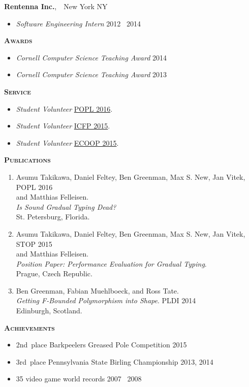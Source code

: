 \documentclass{article}
\newcommand{\mysection}[1]{\vspace{0.5cm}
\hspace{-1.3cm}\textsc{\textbf{#1}}~\hrulefill}
\newcommand{\mysubsection}[1]{\hspace{-0.7cm}\textbf{#1}}
\begin{document}
\mysubsection{Rentenna Inc.},~~New York NY
\begin{itemize}
\item \emph{Software Engineering Intern} \hfill 2012 \textendash\ 2014
\end{itemize}

\newpage
\mysection{Awards} %
\begin{itemize}
\item \emph{Cornell Computer Science Teaching Award} \hfill 2014
\item \emph{Cornell Computer Science Teaching Award} \hfill 2013
\end{itemize}



\mysection{Service}
\begin{itemize}
\item \emph{Student Volunteer} \hfill \href{http://conf.researchr.org/home/POPL-2016}{POPL 2016}.
\item \emph{Student Volunteer} \hfill \href{http://icfpconference.org/icfp2015/}{ICFP 2015}.
\item \emph{Student Volunteer} \hfill \href{http://2015.ecoop.org/}{ECOOP 2015}.
\end{itemize}


\mysection{Publications}

\begin{enumerate}
\item
  Asumu Takikawa, Daniel Feltey, Ben Greenman, Max S. New, Jan Vitek, \hfill POPL 2016 \\
   and Matthias Felleisen. \\
   \emph{Is Sound Gradual Typing Dead?} \\
  St. Petersburg, Florida.
\item
  Asumu Takikawa, Daniel Feltey, Ben Greenman, Max S. New, Jan Vitek, \hfill STOP 2015 \\
   and Matthias Felleisen. \\
   \emph{Position Paper: Performance Evaluation for Gradual Typing}. \\
  Prague, Czech Republic.
\item
  Ben Greenman, Fabian Muehlboeck, and Ross Tate. \\
  \emph{Getting F-Bounded Polymorphism into Shape}. \hfill PLDI 2014 \\
  Edinburgh, Scotland.
\end{enumerate}


\mysection{Achievements}

\begin{itemize}
\item 2nd~place Barkpeelers Greased Pole Competition \hfill 2015
\item 3rd~place Pennsylvania State Birling Championship \hfill 2013, 2014
\item 35 video game world records \hfill 2007 \textendash\ 2008
\end{itemize}
\end{document}
